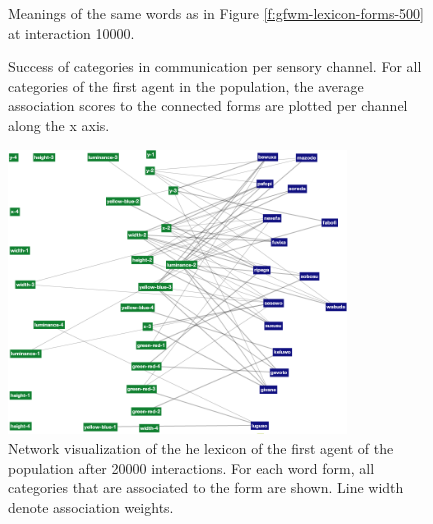 \begin{figure}[t]
  
  \caption{Meanings of the same words as in Figure
    \ref{f:gfwm-lexicon-forms-500} at interaction 10000. }
  \label{f:gfwm-lexicon-forms-10000}
\end{figure}


\begin{figure}[t]
  \caption{Success of categories in communication per sensory channel.
    For all categories of the first agent in the population, the
    average association scores to the connected forms are plotted per
    channel along the x axis.}
  \label{f:gfwm-channel-entrenchment}
\end{figure}


\begin{figure}[t]
  \centerline{\includegraphics[width=0.8\textwidth]{figures/gfwm-lexicon-20000}}
  \caption{Network visualization of the he lexicon of the first agent
    of the population after 20000 interactions. For each word form,
    all categories that are associated to the form are shown. Line
    width denote association weights.}
  \label{f:gfwm-semiotic-network-example}
\end{figure}

